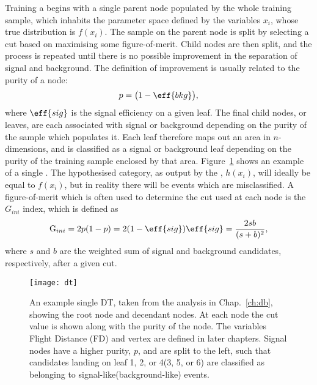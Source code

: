 Training a \DT begins with a single parent node populated by the whole
training sample, which inhabits the parameter space defined by the
variables $x_i$, whose true distribution is $f(x_i)$.
The sample on the parent node is split by selecting a cut based on maximising some figure-of-merit.
Child nodes are then split, and the process is repeated
until there is no possible improvement in the separation of signal and background.
The definition of improvement is usually related to the purity of a node:
\begin{equation}
  p = \big(1-\eff{bkg}\big),
\end{equation}
where $\eff{sig}$ is the signal efficiency on a given leaf.
The final child nodes, or leaves, are each associated with signal or background depending on the
purity of the sample which populates it.
Each leaf therefore maps out an area in $n$-dimensions, and is classified as a signal or background
leaf depending on the purity of the training sample enclosed by that area.
Figure~\ref{fig:bdt:dt} shows an example of a single \DT.
The hypothesised category, as output by the \DT, $h(x_i)$, will ideally be equal to $f(x_i)$, but in reality there will be
events which are misclassified.
A figure-of-merit which is often used to determine the cut used at each node is the $G_{ini}$
index, which is defined as
\begin{equation}
  \mathrm{G}_{ini} = 2p(1-p)
  = 2(1-\eff{sig})\eff{sig}
  = \frac{2sb}{(s+b)^2},
\end{equation}
where $s$ and $b$ are the weighted sum of signal and background candidates, respectively, after a
given cut.


\begin{figure}
  \begin{center}
    \texttt{[image: dt]}
    \caption{
      An example single DT, taken from the analysis in Chap.~\protect\ref{ch:db}, showing the root
      node and decendant nodes.
      At each node the cut value is shown along with the purity of the node.
      The variables Flight Distance (FD) and vertex \chisq are defined in later chapters.
      Signal nodes have a higher purity, $p$, and are split to the left, such that candidates
      landing on leaf 1, 2, or 4(3, 5, or 6) are classified as belonging to
      signal-like(background-like) events.
    }
    \label{fig:bdt:dt}
  \end{center}
\end{figure}

